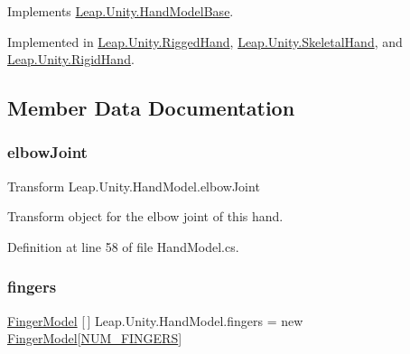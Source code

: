 Implements \mbox{\hyperlink{class_leap_1_1_unity_1_1_hand_model_base_ae80b6c96322d078f01aacc02639d9dd0}{Leap.\+Unity.\+Hand\+Model\+Base}}.



Implemented in \mbox{\hyperlink{class_leap_1_1_unity_1_1_rigged_hand_ac4e41fd3965e2d0d56379d3fc6011128}{Leap.\+Unity.\+Rigged\+Hand}}, \mbox{\hyperlink{class_leap_1_1_unity_1_1_skeletal_hand_afe381218670f759392ccbb420dae78f4}{Leap.\+Unity.\+Skeletal\+Hand}}, and \mbox{\hyperlink{class_leap_1_1_unity_1_1_rigid_hand_a335a489bb61e5d3a95119ffdda8794b1}{Leap.\+Unity.\+Rigid\+Hand}}.



\subsection{Member Data Documentation}
\mbox{\label{class_leap_1_1_unity_1_1_hand_model_a171cf7f14613147a8f0dff7dfd3efd91}} 
\subsubsection{\texorpdfstring{elbowJoint}{elbowJoint}}
{\footnotesize\ttfamily Transform Leap.\+Unity.\+Hand\+Model.\+elbow\+Joint}

Transform object for the elbow joint of this hand. 

Definition at line 58 of file Hand\+Model.\+cs.

\mbox{\label{class_leap_1_1_unity_1_1_hand_model_a51a8c47034746f5961815b6276db2eee}} 
\subsubsection{\texorpdfstring{fingers}{fingers}}
{\footnotesize\ttfamily \mbox{\hyperlink{class_leap_1_1_unity_1_1_finger_model}{Finger\+Model}} \mbox{[}$\,$\mbox{]} Leap.\+Unity.\+Hand\+Model.\+fingers = new \mbox{\hyperlink{class_leap_1_1_unity_1_1_finger_model}{Finger\+Model}}\mbox{[}\mbox{\hyperlink{class_leap_1_1_unity_1_1_hand_model_a251c19cef47a9e349acfaa333219a495}{N\+U\+M\+\_\+\+F\+I\+N\+G\+E\+RS}}\mbox{]}}

